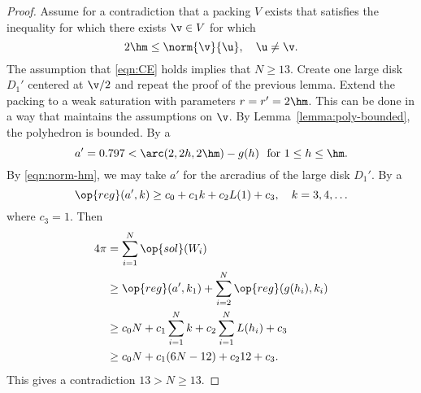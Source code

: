 \begin{proof} Assume for a contradiction that a packing $V$ exists that
  satisfies the inequality for which there exists $\v\in V$ for which 
\begin{equation}\label{eqn:norm-hm}
2\hm\le\norm{\v}{\u},\quad \u\ne \v.
\end{equation}
The assumption that \eqref{eqn:CE} holds implies that $N\ge 13$.
Create one large disk $D_1'$ centered at $\v/2$ and repeat the proof
of the previous lemma.  Extend the packing to a  weak saturation
with parameters $r=r'=2\hm$.  This can be done in a way that maintains
the assumptions on $\v$.  By Lemma~\ref{lemma:poly-bounded}, the
polyhedron is bounded.  By a  %
\[ a'=0.797 < \arc(2,2h,2\hm)-g(h)\text{\ \ for } 1\le h \le \hm.\]  
By \eqref{eqn:norm-hm}, we may take $a'$
for the arcradius of the large disk $D_1'$.  
By a    %
\begin{equation}\label{eqn:alin2} 
\op{reg}(a',k) \ge c_0 + c_1 k + c_2 L(1) +
c_3,\quad k=3,4,\ldots\end{equation}
where
$c_3 =  1$.  %
Then 
\begin{align*} \label{eqn:D'}
4\pi &= \sum_{i=1}^{N}\op{sol}(W_i)\\
&\ge \op{reg}(a',k_1)+\sum_{i=2}^{N} \op{reg}(g(h_i),k_i) \\
&\ge  c_0 N +c_1\sum_{i=1}^{N} k + c_2 \sum_{i=1}^{N} L(h_i) + c_3\\
&\ge c_0 N +c_1 (6N-12) + c_2 12 + c_3.
\end{align*}
This gives a contradiction
$13 > N \ge 13.$
\end{proof}
